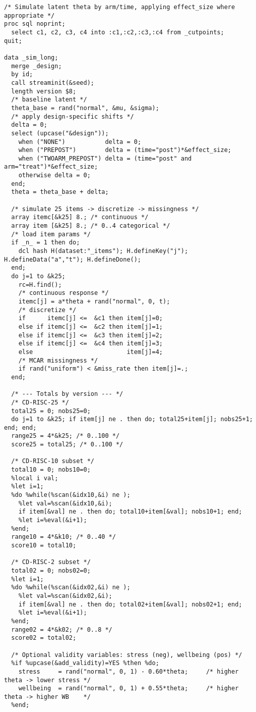 \documentclass[12pt]{article}
\begin{document}
\begin{lstlisting}
/* Simulate latent theta by arm/time, applying effect_size where appropriate */
proc sql noprint;
  select c1, c2, c3, c4 into :c1,:c2,:c3,:c4 from _cutpoints;
quit;

data _sim_long;
  merge _design;
  by id;
  call streaminit(&seed);
  length version $8;
  /* baseline latent */
  theta_base = rand("normal", &mu, &sigma);
  /* apply design-specific shifts */
  delta = 0;
  select (upcase("&design"));
    when ("NONE")           delta = 0;
    when ("PREPOST")        delta = (time="post")*&effect_size;
    when ("TWOARM_PREPOST") delta = (time="post" and arm="treat")*&effect_size;
    otherwise delta = 0;
  end;
  theta = theta_base + delta;

  /* simulate 25 items -> discretize -> missingness */
  array itemc[&k25] 8.; /* continuous */
  array item [&k25] 8.; /* 0..4 categorical */
  /* load item params */
  if _n_ = 1 then do;
    dcl hash H(dataset:"_items"); H.defineKey("j"); H.defineData("a","t"); H.defineDone();
  end;
  do j=1 to &k25;
    rc=H.find();
    /* continuous response */
    itemc[j] = a*theta + rand("normal", 0, t);
    /* discretize */
    if      itemc[j] <=  &c1 then item[j]=0;
    else if itemc[j] <=  &c2 then item[j]=1;
    else if itemc[j] <=  &c3 then item[j]=2;
    else if itemc[j] <=  &c4 then item[j]=3;
    else                          item[j]=4;
    /* MCAR missingness */
    if rand("uniform") < &miss_rate then item[j]=.;
  end;

  /* --- Totals by version --- */
  /* CD-RISC-25 */
  total25 = 0; nobs25=0;
  do j=1 to &k25; if item[j] ne . then do; total25+item[j]; nobs25+1; end; end;
  range25 = 4*&k25; /* 0..100 */
  score25 = total25; /* 0..100 */

  /* CD-RISC-10 subset */
  total10 = 0; nobs10=0;
  %local i val;
  %let i=1;
  %do %while(%scan(&idx10,&i) ne );
    %let val=%scan(&idx10,&i);
    if item[&val] ne . then do; total10+item[&val]; nobs10+1; end;
    %let i=%eval(&i+1);
  %end;
  range10 = 4*&k10; /* 0..40 */
  score10 = total10;

  /* CD-RISC-2 subset */
  total02 = 0; nobs02=0;
  %let i=1;
  %do %while(%scan(&idx02,&i) ne );
    %let val=%scan(&idx02,&i);
    if item[&val] ne . then do; total02+item[&val]; nobs02+1; end;
    %let i=%eval(&i+1);
  %end;
  range02 = 4*&k02; /* 0..8 */
  score02 = total02;

  /* Optional validity variables: stress (neg), wellbeing (pos) */
  %if %upcase(&add_validity)=YES %then %do;
    stress     = rand("normal", 0, 1) - 0.60*theta;     /* higher theta -> lower stress */
    wellbeing  = rand("normal", 0, 1) + 0.55*theta;     /* higher theta -> higher WB    */
  %end;


\end{lstlisting}
\end{document}
